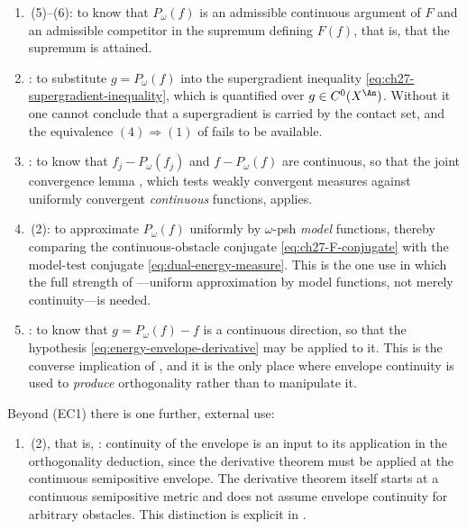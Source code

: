 \begin{enumerate}
\item[\textup{(EC2)}]
\,(5)--(6): to know that $P_\omega(f)$ is
an admissible continuous argument of $F$ and an admissible competitor in the supremum defining $F(f)$, that is, that the
supremum is attained.
\item[\textup{(EC3)}]
: to substitute $g=P_\omega(f)$
into the supergradient inequality \eqref{eq:ch27-supergradient-inequality},
which is quantified over $g\in C^0(X^{\An})$.  Without it one cannot
conclude that a supergradient is carried by the contact set, and the
equivalence $(4)\Rightarrow(1)$ of
 fails to be available.
\item[\textup{(EC4)}]
: to know that
$f_j-P_\omega(f_j)$ and $f-P_\omega(f)$ are continuous, so that the
joint convergence lemma , which tests weakly
convergent measures against uniformly convergent \emph{continuous}
functions, applies.
\item[\textup{(EC5)}]
\,(2): to approximate
$P_\omega(f)$ uniformly by $\omega$-psh \emph{model} functions, thereby
comparing the continuous-obstacle conjugate \eqref{eq:ch27-F-conjugate}
with the model-test conjugate \eqref{eq:dual-energy-measure}.  This is the
one use in which the full strength of
---uniform approximation by model
functions, not merely continuity---is needed.
\item[\textup{(EC6)}]
: to know that
$g=P_\omega(f)-f$ is a continuous direction, so that the hypothesis
\eqref{eq:energy-envelope-derivative} may be applied to it.  This is the
converse implication of
, and it is the only
place where envelope continuity is used to \emph{produce} orthogonality
rather than to manipulate it.
\end{enumerate}

Beyond \textup{(EC1)} there is one further, external use:

\begin{enumerate}
\item[\textup{(EC7)}]
\,(2), that is,
: continuity of the envelope is an
input to its application in the orthogonality deduction, since the
derivative theorem must be applied at the continuous semipositive envelope.
The derivative theorem itself starts at a continuous semipositive metric
and does not assume envelope continuity for arbitrary obstacles.
This distinction is explicit in \cite[Theorems~5.4.3 and~6.3.2]{BGGJKM20}.
\end{enumerate}

